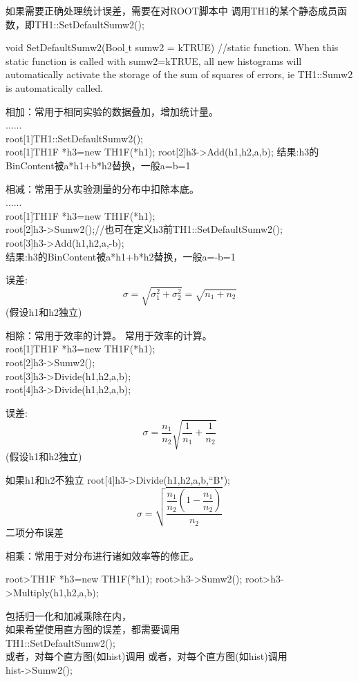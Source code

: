 \documentclass[12pt,a4paper]{article}
\begin{document}
如果需要正确处理统计误差，需要在对ROOT脚本中 调用TH1的某个静态成员函数，即TH1::SetDefaultSumw2();

void SetDefaultSumw2(Bool$\_$t sumw2 = kTRUE) //static function. When this static function is called with sumw2=kTRUE, all new histograms will automatically activate the storage of the sum of squares of errors, ie TH1::Sumw2 is automatically called.


相加：常用于相同实验的数据叠加，增加统计量。\\
...... \\
root[1]TH1::SetDefaultSumw2(); \\
root[1]TH1F *h3=new TH1F(*h1); root[2]h3->Add(h1,h2,a,b); 结果:h3的BinContent被a*h1+b*h2替换，一般a=b=1

相减：常用于从实验测量的分布中扣除本底。\\
...... \\
root[1]TH1F *h3=new TH1F(*h1); \\
root[2]h3->Sumw2();//也可在定义h3前TH1::SetDefaultSumw2(); \\
root[3]h3->Add(h1,h2,a,-b); \\
结果:h3的BinContent被a*h1+b*h2替换，一般a=-b=1

误差:
\begin{equation}
\sigma = \sqrt{\sigma_1^2+\sigma_2^2} = \sqrt{n_1 +n_2}
\end{equation}
(假设h1和h2独立) 

相除：常用于效率的计算。 常用于效率的计算。\\
root[1]TH1F *h3=new TH1F(*h1); \\
root[2]h3->Sumw2(); \\
root[3]h3->Divide(h1,h2,a,b); \\
root[4]h3->Divide(h1,h2,a,b);

误差:
\begin{equation}
\sigma = \frac{n_1}{n_2} \sqrt{\frac{1}{n_1}+\frac{1}{n_2}} 
\end{equation}
(假设h1和h2独立) 

如果h1和h2不独立
root[4]h3->Divide(h1,h2,a,b,``B");
\begin{equation}
\sigma = \sqrt{\dfrac{\dfrac{n_1}{n_2} \left(1-\dfrac{n_1}{n_2}\right)}{n_2}}
\end{equation}
二项分布误差

相乘：常用于对分布进行诸如效率等的修正。

root>TH1F *h3=new TH1F(*h1); root>h3->Sumw2(); root>h3->Multiply(h1,h2,a,b);

包括归一化和加减乘除在内，\\
如果希望使用直方图的误差，都需要调用 \\
TH1::SetDefaultSumw2(); \\
或者，对每个直方图(如hist)调用 或者，对每个直方图(如hist)调用 \\
hist->Sumw2();
\end{document}
